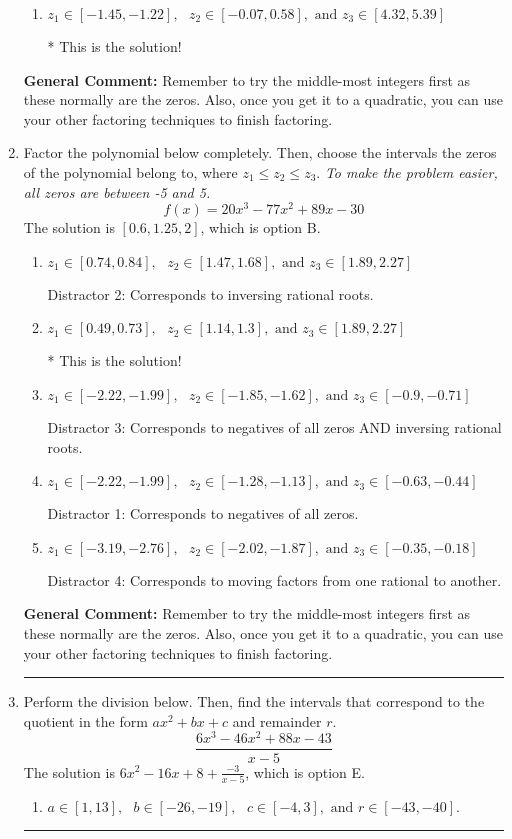 \documentclass{extbook}[14pt]
\newcommand{\litem}[1]{\item #1

\rule{\textwidth}{0.4pt}}
\begin{document}
\begin{enumerate}
{\begin{enumerate}[label=\Alph*.]
 Distractor 1: Corresponds to negatives of all zeros.
\item \( z_1 \in [-1.45, -1.22], \text{   }  z_2 \in [-0.07, 0.58], \text{   and   } z_3 \in [4.32, 5.39] \)

* This is the solution!
\end{enumerate}

\textbf{General Comment:} Remember to try the middle-most integers first as these normally are the zeros. Also, once you get it to a quadratic, you can use your other factoring techniques to finish factoring.
}
\litem{
Factor the polynomial below completely. Then, choose the intervals the zeros of the polynomial belong to, where $z_1 \leq z_2 \leq z_3$. \textit{To make the problem easier, all zeros are between -5 and 5.}
\[ f(x) = 20x^{3} -77 x^{2} +89 x -30 \]The solution is \( [0.6, 1.25, 2] \), which is option B.\begin{enumerate}[label=\Alph*.]
\item \( z_1 \in [0.74, 0.84], \text{   }  z_2 \in [1.47, 1.68], \text{   and   } z_3 \in [1.89, 2.27] \)

 Distractor 2: Corresponds to inversing rational roots.
\item \( z_1 \in [0.49, 0.73], \text{   }  z_2 \in [1.14, 1.3], \text{   and   } z_3 \in [1.89, 2.27] \)

* This is the solution!
\item \( z_1 \in [-2.22, -1.99], \text{   }  z_2 \in [-1.85, -1.62], \text{   and   } z_3 \in [-0.9, -0.71] \)

 Distractor 3: Corresponds to negatives of all zeros AND inversing rational roots.
\item \( z_1 \in [-2.22, -1.99], \text{   }  z_2 \in [-1.28, -1.13], \text{   and   } z_3 \in [-0.63, -0.44] \)

 Distractor 1: Corresponds to negatives of all zeros.
\item \( z_1 \in [-3.19, -2.76], \text{   }  z_2 \in [-2.02, -1.87], \text{   and   } z_3 \in [-0.35, -0.18] \)

 Distractor 4: Corresponds to moving factors from one rational to another.
\end{enumerate}

\textbf{General Comment:} Remember to try the middle-most integers first as these normally are the zeros. Also, once you get it to a quadratic, you can use your other factoring techniques to finish factoring.
}
\litem{
Perform the division below. Then, find the intervals that correspond to the quotient in the form $ax^2+bx+c$ and remainder $r$.
\[ \frac{6x^{3} -46 x^{2} +88 x -43}{x -5} \]The solution is \( 6x^{2} -16 x + 8 + \frac{-3}{x -5} \), which is option E.\begin{enumerate}[label=\Alph*.]
\item \( a \in [1, 13], \text{   } b \in [-26, -19], \text{   } c \in [-4, 3], \text{   and   } r \in [-43, -40]. \)


\end{enumerate}}
\end{enumerate}
\end{document}
